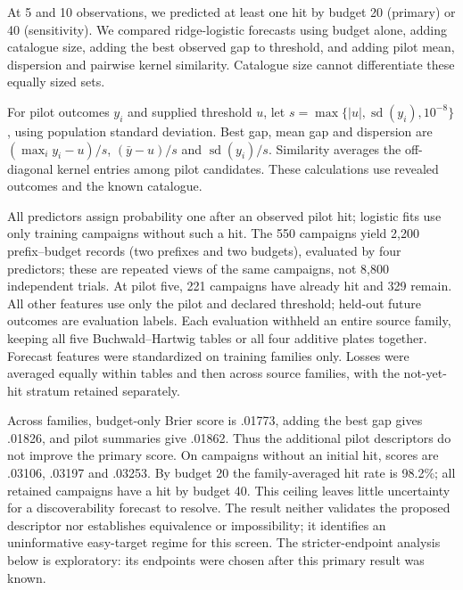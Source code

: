 At 5 and 10 observations, we predicted at least one hit by budget 20 (primary) or 40 (sensitivity). We compared ridge-logistic forecasts using budget alone, adding catalogue size, adding the best observed gap to threshold, and adding pilot mean, dispersion and pairwise kernel similarity. Catalogue size cannot differentiate these equally sized sets.

For pilot outcomes $y_i$ and supplied threshold $u$, let $s=\max\{|u|,\operatorname{sd}(y_i),10^{-8}\}$, using population standard deviation. Best gap, mean gap and dispersion are $(\max_i y_i-u)/s$, $(\bar y-u)/s$ and $\operatorname{sd}(y_i)/s$. Similarity averages the off-diagonal kernel entries among pilot candidates. These calculations use revealed outcomes and the known catalogue.

All predictors assign probability one after an observed pilot hit; logistic fits use only training campaigns without such a hit. The 550 campaigns yield 2,200 prefix--budget records (two prefixes and two budgets), evaluated by four predictors; these are repeated views of the same campaigns, not 8,800 independent trials. At pilot five, 221 campaigns have already hit and 329 remain. All other features use only the pilot and declared threshold; held-out future outcomes are evaluation labels. Each evaluation withheld an entire source family, keeping all five Buchwald--Hartwig tables or all four additive plates together. Forecast features were standardized on training families only. Losses were averaged equally within tables and then across source families, with the not-yet-hit stratum retained separately.

\begin{table}[htbp]\centering\small
\caption{Held-out-family Brier scores after five pilot observations, predicting success by budget 20. Lower is better. All forecasts use the same 550 campaign traces; pilot discoveries count as successes.}
\label{tab:finite_table}

\end{table}

Across families, budget-only Brier score is .01773, adding the best gap gives .01826, and pilot summaries give .01862. Thus the additional pilot descriptors do not improve the primary score. On campaigns without an initial hit, scores are .03106, .03197 and .03253. By budget 20 the family-averaged hit rate is 98.2\%; all retained campaigns have a hit by budget 40. This ceiling leaves little uncertainty for a discoverability forecast to resolve. The result neither validates the proposed descriptor nor establishes equivalence or impossibility; it identifies an uninformative easy-target regime for this screen. The stricter-endpoint analysis below is exploratory: its endpoints were chosen after this primary result was known.

